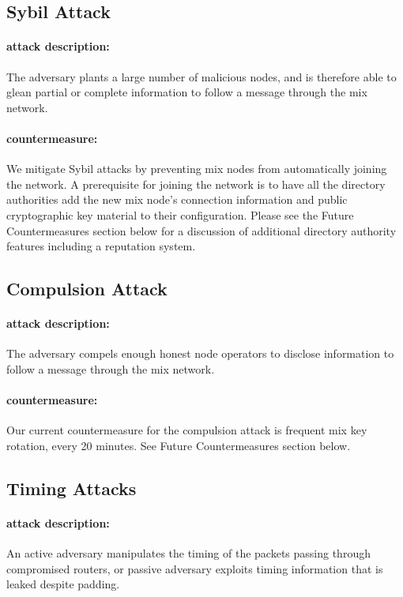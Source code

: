 \documentclass{article}
\begin{document}
\subsection{Sybil Attack}

\paragraph{attack description:} The adversary plants a large number of
malicious nodes, and is therefore able to glean partial or complete information to
follow a message through the mix network.

\paragraph{countermeasure:} We mitigate Sybil attacks by preventing mix nodes from automatically
joining the network. A prerequisite for joining the network is to have all the directory
authorities add the new mix node's connection information and public cryptographic key material to their configuration. Please see the Future Countermeasures section below for a discussion
of additional directory authority features including a reputation system.

\pagebreak

\subsection{Compulsion Attack}

\paragraph{attack description:} The adversary compels enough honest node
operators to disclose information to follow a message through the mix network.

\paragraph{countermeasure:} Our current countermeasure for the compulsion attack is
frequent mix key rotation, every 20 minutes. See Future Countermeasures section below.

\subsection{Timing Attacks}

\paragraph{attack description:} An active adversary manipulates the
timing of the packets passing through compromised routers, or passive adversary
exploits timing information that is leaked despite padding.
\end{document}
